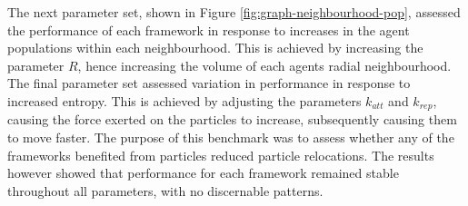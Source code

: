   The next parameter set, shown in Figure \ref{fig:graph-neighbourhood-pop}, assessed the performance of each framework in response to increases in the agent populations within each neighbourhood. This is achieved by increasing the parameter $R$, hence increasing the volume of each agents radial neighbourhood.
  The final parameter set assessed variation in performance in response to increased entropy. This is achieved by adjusting the parameters $k_{att}$ and $k_{rep}$, causing the force exerted on the particles to increase, subsequently causing them to move faster.
  The purpose of this benchmark was to assess whether any of the frameworks benefited from particles reduced particle relocations. The results however showed that performance for each framework remained stable throughout all parameters, with no discernable patterns.
